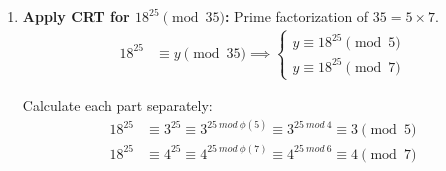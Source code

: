 \documentclass[11pt]{article}
\begin{document}
{\begin{minipage}{0.98\linewidth}
\begin{enumerate}
            Calculate each part separately:
            \begin{align*}
                29^{100} &\equiv 4^{100} \equiv 4^{20 \times 5} \equiv (4^5)^{20} \equiv (-1)^{20} \equiv 1 \pmod{5} \\
                29^{100} &\equiv 1^{100} \equiv 1 \pmod{7}
            \end{align*}
            \vspace{-2.5em}
            
            Apply CRT:
            \vspace{-1.25em}
            \begin{align*}
                x &\equiv (1 \times 7 \times 7^{-1} \pmod{35}) + (1 \times 5 \times 5^{-1} \pmod{35}) \pmod{35}
            \end{align*}

            \vspace{-1em}
            Calculate the modular inverses:

            \vspace{-2.25em}
            \begin{align*}
                7^{-1} &\equiv 3 \pmod{5}, \quad 5^{-1} \equiv 3 \pmod{7}
            \end{align*}

            \vspace{-1em}
            Substitute back into the CRT formula: \vspace{-0.5em}
            \begin{align*}
                x &\equiv (1 \times 7 \times 3) + (1 \times 5 \times 3) \pmod{35} \equiv 1 \pmod{35}
            \end{align*}

            \vspace{-1em}
            \item \textbf{Apply CRT for $18^{25} \pmod{35}$:}
            Prime factorization of $35 = 5 \times 7$. \vspace{-1em}
            \begin{align*}
                18^{25} &\equiv y \pmod{35} \implies
                \begin{cases}
                    y \equiv 18^{25} \pmod{5} \\
                    y \equiv 18^{25} \pmod{7}
                \end{cases}
            \end{align*}

            \vspace{-1em}
            Calculate each part separately: \vspace{-0.5em}
            \begin{align*}
                18^{25} &\equiv 3^{25} \equiv 3^{25 \ mod \ \phi(5)} \equiv 3^{25 \ mod \ 4} \equiv 3 \pmod{5} \\
                18^{25} &\equiv 4^{25} \equiv 4^{25 \ mod \ \phi(7)} \equiv 4^{25 \ mod \ 6} \equiv 4 \pmod{7} 
            \end{align*}


\end{enumerate}
\end{minipage}}
\end{document}
